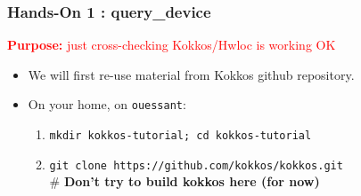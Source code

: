 \begin{frame}
  \frametitle{Hands-On 1 : query\_device}

  {\large\textcolor{red}{\textbf{Purpose:} just cross-checking Kokkos/Hwloc is working OK}}

  \begin{itemize}
  \item We will first re-use material from Kokkos github repository.
  \item On your home, on \texttt{ouessant}: 
    \begin{enumerate}
    \item \texttt{mkdir kokkos-tutorial; cd kokkos-tutorial}
    \item \texttt{git clone https://github.com/kokkos/kokkos.git} \\
      \# \textbf{Don't try to build kokkos here (for now)}
    \end{enumerate}
  \end{itemize}

\end{frame}

